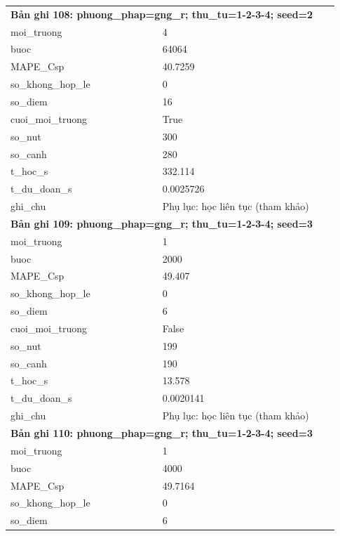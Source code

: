 \begin{longtable}{p{0.43\linewidth}p{0.50\linewidth}}
\midrule
\multicolumn{2}{p{0.95\linewidth}}{\textbf{Bản ghi 108: phuong\_phap=gng\_r; thu\_tu=1-2-3-4; seed=2}} \\
moi\_\allowbreak truong & 4 \\
buoc & 64064 \\
MAPE\_\allowbreak Csp & 40.7259 \\
so\_\allowbreak khong\_\allowbreak hop\_\allowbreak le & 0 \\
so\_\allowbreak diem & 16 \\
cuoi\_\allowbreak moi\_\allowbreak truong & True \\
so\_\allowbreak nut & 300 \\
so\_\allowbreak canh & 280 \\
t\_\allowbreak hoc\_\allowbreak s & 332.114 \\
t\_\allowbreak du\_\allowbreak doan\_\allowbreak s & 0.0025726 \\
ghi\_\allowbreak chu & Phụ lục: học liên tục (tham khảo) \\
\midrule
\multicolumn{2}{p{0.95\linewidth}}{\textbf{Bản ghi 109: phuong\_phap=gng\_r; thu\_tu=1-2-3-4; seed=3}} \\
moi\_\allowbreak truong & 1 \\
buoc & 2000 \\
MAPE\_\allowbreak Csp & 49.407 \\
so\_\allowbreak khong\_\allowbreak hop\_\allowbreak le & 0 \\
so\_\allowbreak diem & 6 \\
cuoi\_\allowbreak moi\_\allowbreak truong & False \\
so\_\allowbreak nut & 199 \\
so\_\allowbreak canh & 190 \\
t\_\allowbreak hoc\_\allowbreak s & 13.578 \\
t\_\allowbreak du\_\allowbreak doan\_\allowbreak s & 0.0020141 \\
ghi\_\allowbreak chu & Phụ lục: học liên tục (tham khảo) \\
\midrule
\multicolumn{2}{p{0.95\linewidth}}{\textbf{Bản ghi 110: phuong\_phap=gng\_r; thu\_tu=1-2-3-4; seed=3}} \\
moi\_\allowbreak truong & 1 \\
buoc & 4000 \\
MAPE\_\allowbreak Csp & 49.7164 \\
so\_\allowbreak khong\_\allowbreak hop\_\allowbreak le & 0 \\
so\_\allowbreak diem & 6 \\

\end{longtable}
